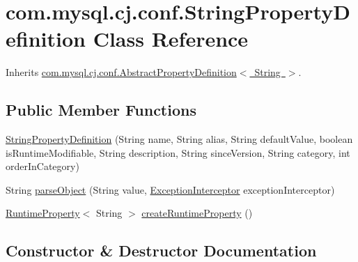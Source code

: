 \hypertarget{classcom_1_1mysql_1_1cj_1_1conf_1_1_string_property_definition}{}\section{com.\+mysql.\+cj.\+conf.\+String\+Property\+Definition Class Reference}
\label{classcom_1_1mysql_1_1cj_1_1conf_1_1_string_property_definition}


Inherits \mbox{\hyperlink{classcom_1_1mysql_1_1cj_1_1conf_1_1_abstract_property_definition}{com.\+mysql.\+cj.\+conf.\+Abstract\+Property\+Definition$<$ String $>$}}.

\subsection*{Public Member Functions}
\begin{DoxyCompactItemize}
\item 
\mbox{\hyperlink{classcom_1_1mysql_1_1cj_1_1conf_1_1_string_property_definition_a4347ac471908acdec5b2652266cd54ff}{String\+Property\+Definition}} (String name, String alias, String default\+Value, boolean is\+Runtime\+Modifiable, String description, String since\+Version, String category, int order\+In\+Category)
\item 
String \mbox{\hyperlink{classcom_1_1mysql_1_1cj_1_1conf_1_1_string_property_definition_aa532cc6f4673a7c64d941e74c2c23e0e}{parse\+Object}} (String value, \mbox{\hyperlink{interfacecom_1_1mysql_1_1cj_1_1exceptions_1_1_exception_interceptor}{Exception\+Interceptor}} exception\+Interceptor)
\item 
\mbox{\hyperlink{interfacecom_1_1mysql_1_1cj_1_1conf_1_1_runtime_property}{Runtime\+Property}}$<$ String $>$ \mbox{\hyperlink{classcom_1_1mysql_1_1cj_1_1conf_1_1_string_property_definition_a1d4bb7606f37440e5eb68b6724647fd1}{create\+Runtime\+Property}} ()
\end{DoxyCompactItemize}


\subsection{Constructor \& Destructor Documentation}
\mbox{\label{classcom_1_1mysql_1_1cj_1_1conf_1_1_string_property_definition_a4347ac471908acdec5b2652266cd54ff}} 
